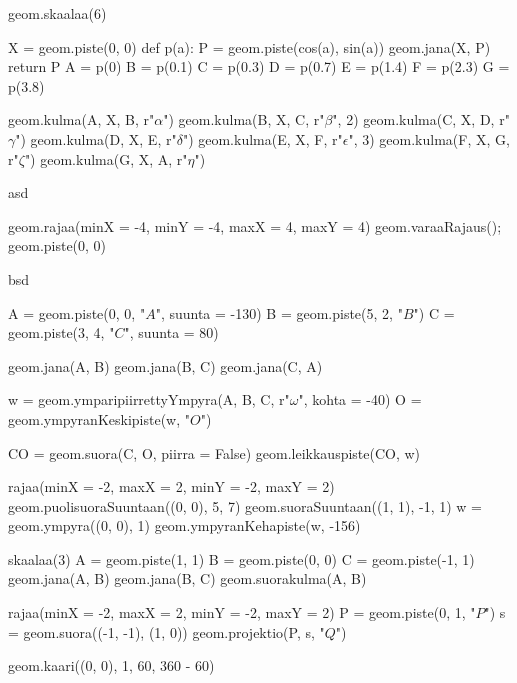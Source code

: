 \begin{kuva}
geom.skaalaa(6)

X = geom.piste(0, 0)
def p(a):
	P = geom.piste(cos(a), sin(a))
	geom.jana(X, P)
	return P
A = p(0)
B = p(0.1)
C = p(0.3)
D = p(0.7)
E = p(1.4)
F = p(2.3)
G = p(3.8)

geom.kulma(A, X, B, r"$\alpha$")
geom.kulma(B, X, C, r"$\beta$", 2)
geom.kulma(C, X, D, r"$\gamma$")
geom.kulma(D, X, E, r"$\delta$")
geom.kulma(E, X, F, r"$\epsilon$", 3)
geom.kulma(F, X, G, r"$\zeta$")
geom.kulma(G, X, A, r"$\eta$")
\end{kuva}

asd

\begin{kuva}
geom.rajaa(minX = -4, minY = -4, maxX = 4, maxY = 4)
geom.varaaRajaus();
geom.piste(0, 0)
\end{kuva}

bsd


\begin{kuva}
A = geom.piste(0, 0, "$A$", suunta = -130)
B = geom.piste(5, 2, "$B$")
C = geom.piste(3, 4, "$C$", suunta = 80)

geom.jana(A, B)
geom.jana(B, C)
geom.jana(C, A)

w = geom.ymparipiirrettyYmpyra(A, B, C, r"$\omega$", kohta = -40)
O = geom.ympyranKeskipiste(w, "$O$")

CO = geom.suora(C, O, piirra = False)
geom.leikkauspiste(CO, w)
\end{kuva}

\begin{kuva}
rajaa(minX = -2, maxX = 2, minY = -2, maxY = 2)
geom.puolisuoraSuuntaan((0, 0), 5, 7)
geom.suoraSuuntaan((1, 1), -1, 1)
w = geom.ympyra((0, 0), 1)
geom.ympyranKehapiste(w, -156)
\end{kuva}

\begin{kuva}
skaalaa(3)
A = geom.piste(1, 1)
B = geom.piste(0, 0)
C = geom.piste(-1, 1)
geom.jana(A, B)
geom.jana(B, C)
geom.suorakulma(A, B)
\end{kuva}

\begin{kuva}
rajaa(minX = -2, maxX = 2, minY = -2, maxY = 2)
P = geom.piste(0, 1, "$P$")
s = geom.suora((-1, -1), (1, 0))
geom.projektio(P, s, "$Q$")
\end{kuva}

\begin{kuva}
geom.kaari((0, 0), 1, 60, 360 - 60)
\end{kuva}
